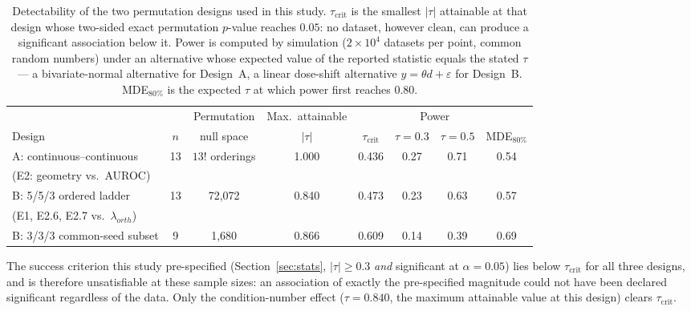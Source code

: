 \begin{table}[htbp]
\centering
\caption{Detectability of the two permutation designs used in this study. $\tau_{\mathrm{crit}}$ is the smallest $|\tau|$ attainable at that design whose two-sided exact permutation $p$-value reaches $0.05$: no dataset, however clean, can produce a significant association below it. Power is computed by simulation ($2\times10^{4}$ datasets per point, common random numbers) under an alternative whose expected value of the reported statistic equals the stated $\tau$ --- a bivariate-normal alternative for Design~A, a linear dose-shift alternative $y=\theta d+\varepsilon$ for Design~B. MDE$_{80\%}$ is the expected $\tau$ at which power first reaches $0.80$.}
\label{tab:s8-power}
\small
\begin{tabular}{lccccccc}
\toprule
& & Permutation & Max.\ attainable & & \multicolumn{2}{c}{Power} & \\
\cmidrule(lr){6-7}
Design & $n$ & null space & $|\tau|$ & $\tau_{\mathrm{crit}}$ & $\tau=0.3$ & $\tau=0.5$ & MDE$_{80\%}$ \\
\midrule
A: continuous--continuous            & 13 & $13!$ orderings & 1.000 & 0.436 & 0.27 & 0.71 & 0.54 \\
\quad (E2: geometry vs.\ AUROC)      &    &                 &       &       &      &      &      \\
B: 5/5/3 ordered ladder              & 13 & 72,072          & 0.840 & 0.473 & 0.23 & 0.63 & 0.57 \\
\quad (E1, E2.6, E2.7 vs.\ $\lambda_{orth}$) &  &            &       &       &      &      &      \\
B: 3/3/3 common-seed subset          &  9 & 1,680           & 0.866 & 0.609 & 0.14 & 0.39 & 0.69 \\
\bottomrule
\end{tabular}

\vspace{0.25cm}
\small The success criterion this study pre-specified (Section~\ref{sec:stats}, $|\tau|\geq0.3$ \emph{and} significant at $\alpha=0.05$) lies below $\tau_{\mathrm{crit}}$ for all three designs, and is therefore unsatisfiable at these sample sizes: an association of exactly the pre-specified magnitude could not have been declared significant regardless of the data. Only the condition-number effect ($\tau=0.840$, the maximum attainable value at this design) clears $\tau_{\mathrm{crit}}$.
\end{table}
